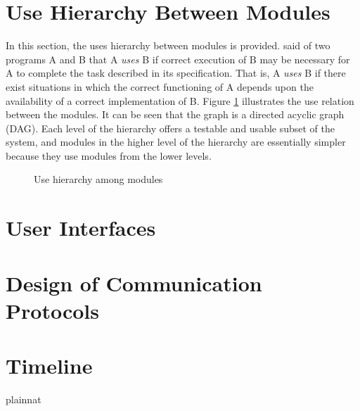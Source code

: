 \documentclass[12pt, titlepage]{article}
\begin{document}
\section{Use Hierarchy Between Modules} \label{SecUse}

In this section, the uses hierarchy between modules is
provided. \citet{Parnas1978} said of two programs A and B that A {\em uses} B if
correct execution of B may be necessary for A to complete the task described in
its specification. That is, A {\em uses} B if there exist situations in which
the correct functioning of A depends upon the availability of a correct
implementation of B.  Figure \ref{FigUH} illustrates the use relation between
the modules. It can be seen that the graph is a directed acyclic graph
(DAG). Each level of the hierarchy offers a testable and usable subset of the
system, and modules in the higher level of the hierarchy are essentially simpler
because they use modules from the lower levels.

\begin{figure}[H]
\centering
\caption{Use hierarchy among modules}
\label{FigUH}
\end{figure}


\section{User Interfaces}


\section{Design of Communication Protocols}


\section{Timeline}



 {plainnat}


\newpage{}
\end{document}
